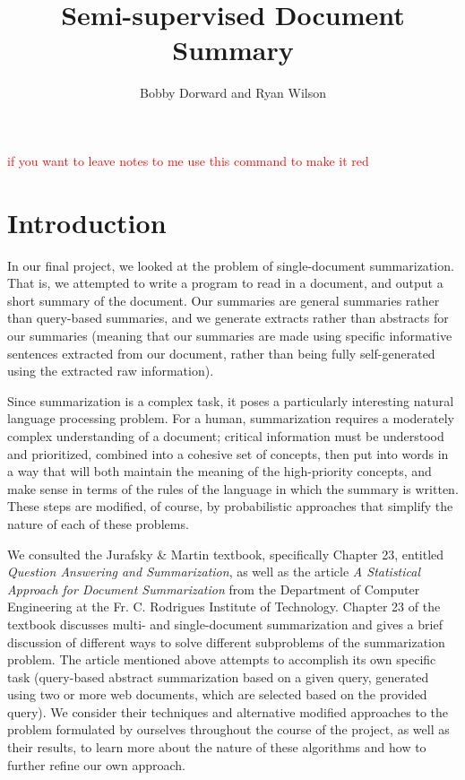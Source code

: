 \documentclass[12pt]{article}
\theoremstyle{plain}
\theoremstyle{definition}
\theoremstyle{remark}
\theoremstyle{plain}
\newcommand{\tre}{\textcolor{red}}
\begin{document}
\author{Bobby Dorward and Ryan Wilson}
\title{Semi-supervised Document Summary}
\maketitle

\tre{if you want to leave notes to me use this command to make it red}

\section{Introduction}
	In our final project, we looked at the problem of single-document summarization. That is, we attempted to write a program to read in a document, and output a short summary of the document. Our summaries are general summaries rather than query-based summaries, and we generate extracts rather than abstracts for our summaries (meaning that our summaries are made using specific informative sentences extracted from our document, rather than being fully self-generated using the extracted raw information).
	
	Since summarization is a complex task, it poses a particularly interesting natural language processing problem. For a human, summarization requires a moderately complex understanding of a document; critical information must be understood and prioritized, combined into a cohesive set of concepts, then put into words in a way that will both maintain the meaning of the high-priority concepts, and make sense in terms of the rules of the language in which the summary is written. These steps are modified, of course, by probabilistic approaches that simplify the nature of each of these problems.
	
	We consulted the Jurafsky \& Martin textbook, specifically Chapter 23, entitled \emph{Question Answering and Summarization}, as well as the article \emph{A Statistical Approach for Document Summarization} from the Department of Computer Engineering at the Fr. C. Rodrigues Institute of Technology. Chapter 23 of the textbook discusses multi- and single-document summarization and gives a brief discussion of different ways to solve different subproblems of the summarization problem. The article mentioned above attempts to accomplish its own specific task (query-based abstract summarization based on a given query, generated using two or more web documents, which are selected based on the provided query). We consider their techniques and alternative modified approaches to the problem formulated by ourselves throughout the course of the project, as well as their results, to learn more about the nature of these algorithms and how to further refine our own approach.
\end{document}
